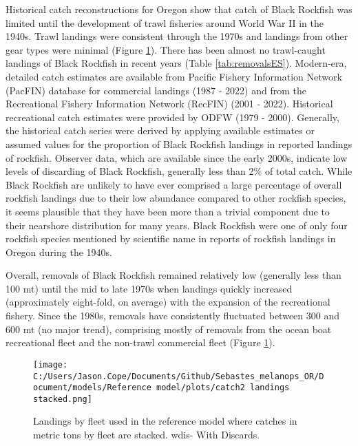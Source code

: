 \documentclass[11pt,
  letterpaper,
]{article}
\begin{document}
Historical catch reconstructions for Oregon show that catch of Black Rockfish was limited until the development of trawl fisheries around World War II in the 1940s. Trawl landings were consistent through the 1970s and landings from other gear types were minimal (Figure \ref{fig:es-catch}). There has been almost no trawl-caught landings of Black Rockfish in recent years (Table \ref{tab:removalsES}). Modern-era, detailed catch estimates are available from Pacific Fishery Information Network (PacFIN) database for commercial landings (1987 - 2022) and from the Recreational Fishery Information Network (RecFIN) (2001 - 2022). Historical recreational catch estimates were provided by ODFW (1979 - 2000). Generally, the historical catch series were derived by applying available estimates or assumed values for the proportion of Black Rockfish landings in reported landings of rockfish. Observer data, which are available since the early 2000s, indicate low levels of discarding of Black Rockfish, generally less than 2\% of total catch. While Black Rockfish are unlikely to have ever comprised a large percentage of overall rockfish landings due to their low abundance compared to other rockfish species, it seems plausible that they have been more than a trivial component due to their nearshore distribution for many years. Black Rockfish were one of only four rockfish species mentioned by scientific name in reports of rockfish landings in Oregon during the 1940s.

Overall, removals of Black Rockfish remained relatively low (generally less than 100 mt) until the mid to late 1970s when landings quickly increased (approximately eight-fold, on average) with the expansion of the recreational fishery. Since the 1980s, removals have consistently fluctuated between 300 and 600 mt (no major trend), comprising mostly of removals from the ocean boat recreational fleet and the non-trawl commercial fleet (Figure \ref{fig:es-catch}).



\begin{figure}
{\centering
\texttt{[image: C:/Users/Jason.Cope/Documents/Github/Sebastes\_melanops\_OR/Document/models/Reference model/plots/catch2 landings stacked.png]}
}
\caption{Landings by fleet used in the reference model where catches in metric tons by fleet are stacked. wdis- With Discards.\label{fig:es-catch}}
\end{figure}
\end{document}
